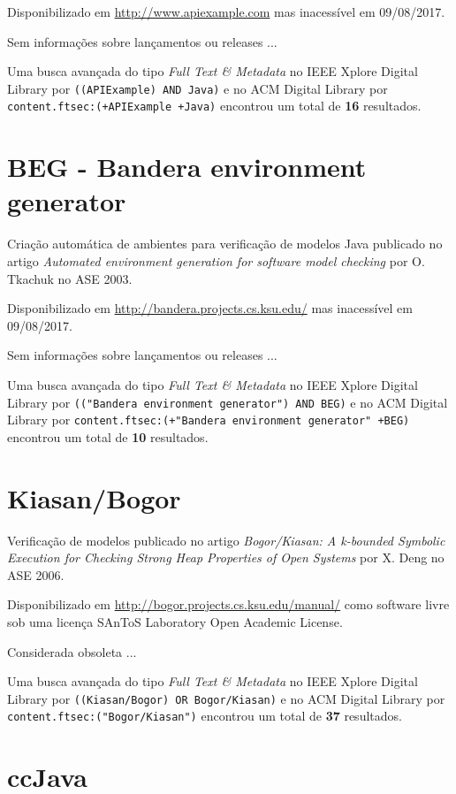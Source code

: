 Disponibilizado em \url{http://www.apiexample.com}
mas inacessível em 09/08/2017.

Sem informações sobre lançamentos ou releases ...


Uma busca avançada do tipo {\it Full Text \& Metadata} no IEEE Xplore Digital Library por
\texttt{((APIExample) AND Java)}
e no ACM Digital Library por
\texttt{content.ftsec:(+APIExample +Java)}
encontrou um total de
{\bf 16}
resultados.

\section{BEG - Bandera environment generator}

Criação automática de ambientes para verificação de modelos Java
publicado no artigo {\it Automated environment generation for software model checking}
por O. Tkachuk
no ASE 2003.

Disponibilizado em \url{http://bandera.projects.cs.ksu.edu/}
mas inacessível em 09/08/2017.

Sem informações sobre lançamentos ou releases ...


Uma busca avançada do tipo {\it Full Text \& Metadata} no IEEE Xplore Digital Library por
\texttt{(("Bandera environment generator") AND BEG)}
e no ACM Digital Library por
\texttt{content.ftsec:(+"Bandera environment generator" +BEG)}
encontrou um total de
{\bf 10}
resultados.

\section{Kiasan/Bogor}

Verificação de modelos
publicado no artigo {\it Bogor/Kiasan: A k-bounded Symbolic Execution for Checking Strong Heap Properties of Open Systems}
por X. Deng
no ASE 2006.

Disponibilizado em \url{http://bogor.projects.cs.ksu.edu/manual/}
como software livre
sob uma licença SAnToS Laboratory Open Academic License.

Considerada obsoleta ...


Uma busca avançada do tipo {\it Full Text \& Metadata} no IEEE Xplore Digital Library por
\texttt{((Kiasan/Bogor) OR Bogor/Kiasan)}
e no ACM Digital Library por
\texttt{content.ftsec:("Bogor/Kiasan")}
encontrou um total de
{\bf 37}
resultados.

\section{ccJava}

